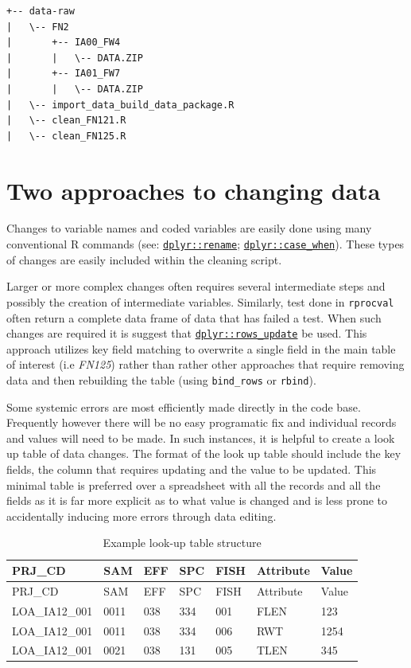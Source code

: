 \documentclass[
]{book}
\begin{document}
\begin{verbatim}
+-- data-raw
|   \-- FN2
|       +-- IA00_FW4
|       |   \-- DATA.ZIP
|       +-- IA01_FW7
|       |   \-- DATA.ZIP
|   \-- import_data_build_data_package.R
|   \-- clean_FN121.R
|   \-- clean_FN125.R
\end{verbatim}

\hypertarget{two-approaches-to-changing-data}{%
\section{Two approaches to changing data}\label{two-approaches-to-changing-data}}

Changes to variable names and coded variables are easily done using many conventional R commands (see: \href{https://dplyr.tidyverse.org/reference/rename.html}{\texttt{dplyr::rename}}; \href{https://dplyr.tidyverse.org/reference/case_when.html}{\texttt{dplyr::case\_when}}). These types of changes are easily included within the cleaning script.

Larger or more complex changes often requires several intermediate steps and possibly the creation of intermediate variables. Similarly, test done in \texttt{rprocval} often return a complete data frame of data that has failed a test. When such changes are required it is suggest that \href{https://dplyr.tidyverse.org/reference/rows.html}{\texttt{dplyr::rows\_update}} be used. This approach utilizes key field matching to overwrite a single field in the main table of interest (i.e \emph{FN125}) rather than rather other approaches that require removing data and then rebuilding the table (using \texttt{bind\_rows} or \texttt{rbind}).

Some systemic errors are most efficiently made directly in the code base. Frequently however there will be no easy programatic fix and individual records and values will need to be made. In such instances, it is helpful to create a look up table of data changes. The format of the look up table should include the key fields, the column that requires updating and the value to be updated. This minimal table is preferred over a spreadsheet with all the records and all the fields as it is far more explicit as to what value is changed and is less prone to accidentally inducing more errors through data editing.

\begin{longtable}[]{@{}lllllll@{}}
\caption{Example look-up table structure}\tabularnewline
\toprule\noalign{}
PRJ\_CD & SAM & EFF & SPC & FISH & Attribute & Value \\
\midrule\noalign{}
\endfirsthead
\toprule\noalign{}
PRJ\_CD & SAM & EFF & SPC & FISH & Attribute & Value \\
\midrule\noalign{}
\endhead
\bottomrule\noalign{}
\endlastfoot
LOA\_IA12\_001 & 0011 & 038 & 334 & 001 & FLEN & 123 \\
LOA\_IA12\_001 & 0011 & 038 & 334 & 006 & RWT & 1254 \\
LOA\_IA12\_001 & 0021 & 038 & 131 & 005 & TLEN & 345 \\
\end{longtable}
\end{document}
